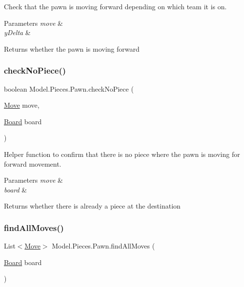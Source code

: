 Check that the pawn is moving forward depending on which team it is on. 
\begin{DoxyParams}{Parameters}
{\em move} & \\
\hline
{\em y\+Delta} & \\
\hline
\end{DoxyParams}
\begin{DoxyReturn}{Returns}
whether the pawn is moving forward 
\end{DoxyReturn}
\hypertarget{class_model_1_1_pieces_1_1_pawn_a92db7183e3d916aa6aed7c9a7cf89ba3}{}\label{class_model_1_1_pieces_1_1_pawn_a92db7183e3d916aa6aed7c9a7cf89ba3} 
\subsubsection{\texorpdfstring{check\+No\+Piece()}{checkNoPiece()}}
{\footnotesize\ttfamily boolean Model.\+Pieces.\+Pawn.\+check\+No\+Piece (\begin{DoxyParamCaption}\item[{\hyperlink{class_model_1_1_move}{Move}}]{move,  }\item[{\hyperlink{class_model_1_1_board}{Board}}]{board }\end{DoxyParamCaption})}

Helper function to confirm that there is no piece where the pawn is moving for forward movement. 
\begin{DoxyParams}{Parameters}
{\em move} & \\
\hline
{\em board} & \\
\hline
\end{DoxyParams}
\begin{DoxyReturn}{Returns}
whether there is already a piece at the destination 
\end{DoxyReturn}
\hypertarget{class_model_1_1_pieces_1_1_pawn_a95dcb404b5207a813149c152d3a48a50}{}\label{class_model_1_1_pieces_1_1_pawn_a95dcb404b5207a813149c152d3a48a50} 
\subsubsection{\texorpdfstring{find\+All\+Moves()}{findAllMoves()}}
{\footnotesize\ttfamily List$<$\hyperlink{class_model_1_1_move}{Move}$>$ Model.\+Pieces.\+Pawn.\+find\+All\+Moves (\begin{DoxyParamCaption}\item[{\hyperlink{class_model_1_1_board}{Board}}]{board }\end{DoxyParamCaption})}

